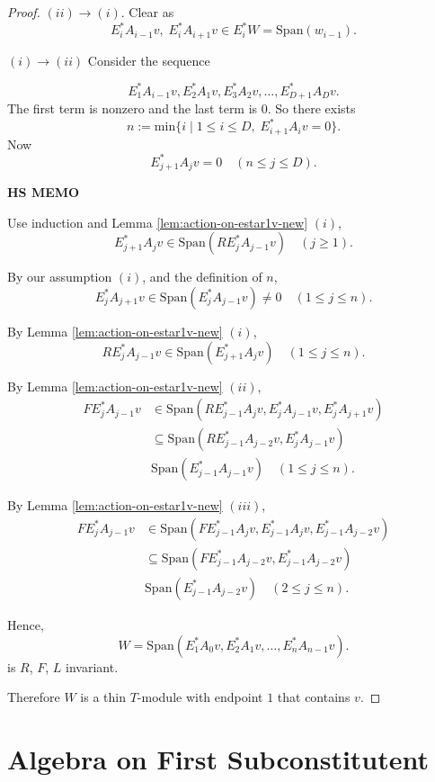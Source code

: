 \documentclass[
]{book}
\theoremstyle{definition}
\theoremstyle{definition}
\theoremstyle{definition}
\theoremstyle{definition}
\theoremstyle{remark}
\begin{document}
\begin{proof}
\((ii)\to(i)\). Clear as
\[E^*_iA_{i-1}v, \; E^*_iA_{i+1}v \in E^*_iW = \mathrm{Span}(w_{i-1}).\]

\((i)\to(ii)\) Consider the sequence

\[E^*_1A_{i-1}v, E^*_2A_1v, E^*_3A_2v, \ldots, E^*_{D+1}A_Dv.\]
The first term is nonzero and the last term is \(0\).
So there exists
\[n := \mathrm{min}\{i\mid 1\leq i\leq D, \; E^*_{i+1}A_iv = 0\}.\]
Now
\begin{equation}
E^*_{j+1}A_jv = 0 \quad (n\leq j\leq D). \label{eq:n}
\end{equation}

\textbf{HS MEMO}

Use induction and Lemma \ref{lem:action-on-estar1v-new} \((i)\),
\[E^*_{j+1}A_jv \in \mathrm{Span}(RE^*_jA_{j-1}v) \quad (j\geq 1).\]

By our assumption \((i)\), and the definition of \(n\),
\[E^*_jA_{j+1}v \in \mathrm{Span}(E^*_jA_{j-1}v)\neq 0 \quad (1\leq j\leq n).\]

By Lemma \ref{lem:action-on-estar1v-new} \((i)\),
\[RE^*_jA_{j-1}v \in \mathrm{Span}(E^*_{j+1}A_jv) \quad (1\leq j\leq n).\]

By Lemma \ref{lem:action-on-estar1v-new} \((ii)\),
\begin{align}
FE^*_jA_{j-1}v & \in \mathrm{Span}(RE^*_{j-1}A_jv, E^*_jA_{j-1}v, E^*_jA_{j+1}v)\\
& \subseteq \mathrm{Span}(RE^*_{j-1}A_{j-2}v, E^*_jA_{j-1}v)\\
& \mathrm{Span}(E^*_{j-1}A_{j-1}v) \quad (1\leq j\leq n).
\end{align}

By Lemma \ref{lem:action-on-estar1v-new} \((iii)\),
\begin{align}
FE^*_jA_{j-1}v & \in \mathrm{Span}(FE^*_{j-1}A_j v, E^*_{j-1}A_{j}v, E^*_{j-1}A_{j-2}v)\\
& \subseteq \mathrm{Span}(FE^*_{j-1}A_{j-2}v, E^*_{j-1}A_{j-2}v)\\
& \mathrm{Span}(E^*_{j-1}A_{j-2}v) \quad (2\leq j\leq n).
\end{align}

Hence,
\[W = \mathrm{Span}(E^*_1A_0v, E^*_2A_1v, \ldots, E^*_nA_{n-1}v).\]
is \(R\), \(F\), \(L\) invariant.

Therefore \(W\) is a thin \(T\)-module with endpoint \(1\) that contains \(v\).
\end{proof}

\hypertarget{lec33}{%
\chapter{Algebra on First Subconstitutent}\label{lec33}}
\end{document}
